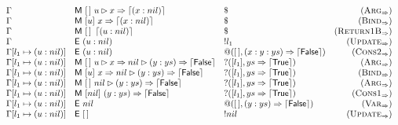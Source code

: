 \begin{figure*}
\[\begin{array}{lllr}
    \Gamma                                  & \textsf{M}~[\,]~u\rhd x \Rightarrow \left\lceil (x : nil)\right\rceil       & \$                                         & (\textsc{Arg}_{\Rightarrow})      \\
    \Gamma                                  & \textsf{M}~[u]~x \Rightarrow \left\lceil (x : nil)\right\rceil                      & \$                                         & (\textsc{Bind}_{\Rightarrow})     \\
    \Gamma                                  & \textsf{M}~[\,]~\left\lceil (u : nil)\right\rceil                      & \$                                         & (\textsc{Return1B}_{\Rightarrow}) \\
    \Gamma                                  & \textsf{E}~(u : nil)                                           & !l_1                                       & (\textsc{Update}_{\Rightarrow})   \\
    \Gamma[l_1\mapsto(u : nil)]
                                            & \textsf{E}~(u : nil)                                           & @([\,],(x : y : ys) \Rightarrow \left\lceil \textsf{False}\right\rceil) & (\textsc{Cons2}_{\Rightarrow})    \\
    \Gamma[l_1\mapsto(u : nil)]             & \textsf{M}~[\,]~u\rhd x \Rightarrow nil\rhd (y : ys) \Rightarrow \left\lceil \textsf{False}\right\rceil
                                            & ?([l_1],ys \Rightarrow \left\lceil \textsf{True}\right\rceil)                           & (\textsc{Arg}_{\Rightarrow})                                                   \\
    \Gamma[l_1\mapsto(u : nil)]             & \textsf{M}~[u]~x \Rightarrow nil\rhd (y : ys) \Rightarrow \left\lceil \textsf{False}\right\rceil
                                            & ?([l_1],ys \Rightarrow \left\lceil \textsf{True}\right\rceil)                           & (\textsc{Bind}_{\Rightarrow})                                                  \\
    \Gamma[l_1\mapsto(u : nil)]             & \textsf{M}~[\,]~nil\rhd (y : ys) \Rightarrow \left\lceil \textsf{False}\right\rceil
                                            & ?([l_1],ys \Rightarrow \left\lceil \textsf{True}\right\rceil)                           & (\textsc{Arg}_{\Rightarrow})                                                   \\
    \Gamma[l_1\mapsto(u : nil)]             & \textsf{M}~[nil]~(y : ys) \Rightarrow \left\lceil \textsf{False}\right\rceil              & ?([l_1],ys \Rightarrow \left\lceil \textsf{True}\right\rceil)           & (\textsc{Cons1}_{\Rightarrow})    \\
    \Gamma[l_1\mapsto(u : nil)]             & \textsf{E}~nil                                                 & @([\,],(y : ys) \Rightarrow \left\lceil \textsf{False}\right\rceil)     & (\textsc{Var}_{\Rightarrow})      \\
    \Gamma[l_1\mapsto(u : nil)]             & \textsf{E}~[\,]                                                & !nil                                       & (\textsc{Update}_{\Rightarrow})   \\

\end{array}\]
\end{figure*}

